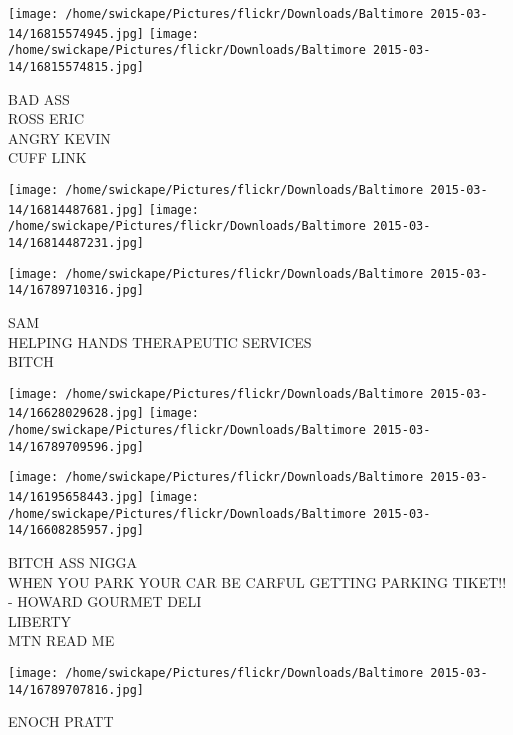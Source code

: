 \documentclass[10pt,letterpaper]{article}
\begin{document}
\texttt{[image: /home/swickape/Pictures/flickr/Downloads/Baltimore 2015-03-14/16815574945.jpg]}
\texttt{[image: /home/swickape/Pictures/flickr/Downloads/Baltimore 2015-03-14/16815574815.jpg]}

BAD ASS\\
ROSS ERIC\\
ANGRY KEVIN\\
CUFF LINK\\
\pagebreak

\texttt{[image: /home/swickape/Pictures/flickr/Downloads/Baltimore 2015-03-14/16814487681.jpg]}
\texttt{[image: /home/swickape/Pictures/flickr/Downloads/Baltimore 2015-03-14/16814487231.jpg]}

\vspace{0.25in}
\texttt{[image: /home/swickape/Pictures/flickr/Downloads/Baltimore 2015-03-14/16789710316.jpg]}

SAM\\
HELPING HANDS THERAPEUTIC SERVICES\\
BITCH\\
\pagebreak

\texttt{[image: /home/swickape/Pictures/flickr/Downloads/Baltimore 2015-03-14/16628029628.jpg]}
\texttt{[image: /home/swickape/Pictures/flickr/Downloads/Baltimore 2015-03-14/16789709596.jpg]}

\texttt{[image: /home/swickape/Pictures/flickr/Downloads/Baltimore 2015-03-14/16195658443.jpg]}
\texttt{[image: /home/swickape/Pictures/flickr/Downloads/Baltimore 2015-03-14/16608285957.jpg]}

BITCH ASS NIGGA\\
WHEN YOU PARK YOUR CAR BE CARFUL GETTING PARKING TIKET!! {-} HOWARD GOURMET DELI\\
LIBERTY\\
MTN READ ME\\
\pagebreak

\texttt{[image: /home/swickape/Pictures/flickr/Downloads/Baltimore 2015-03-14/16789707816.jpg]}

ENOCH PRATT\\
\pagebreak
\end{document}
